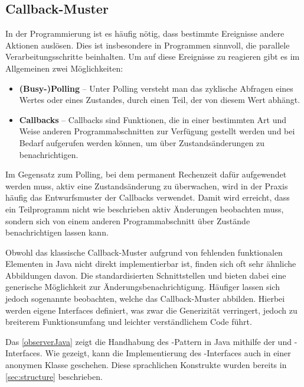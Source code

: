 \subsection{Callback-Muster}
In der Programmierung ist es häufig nötig, dass bestimmte Ereignisse andere Aktionen auslösen. Dies ist insbesondere in Programmen sinnvoll, die parallele Verarbeitungsschritte beinhalten. Um auf diese Ereignisse zu reagieren gibt es im Allgemeinen zwei Möglichkeiten: 

\begin{itemize}
    \item \textbf{(Busy-)Polling} -- Unter Polling versteht man das zyklische Abfragen eines Wertes oder eines Zustandes, durch einen Teil, der von diesem Wert abhängt.
    \item \textbf{Callbacks} -- Callbacks sind Funktionen, die in einer bestimmten Art und Weise anderen Programmabschnitten zur Verfügung gestellt werden und bei Bedarf aufgerufen werden können, um \zB über Zustandsänderungen zu benachrichtigen.
\end{itemize}

Im Gegensatz zum Polling, bei dem permanent Rechenzeit dafür aufgewendet werden muss, aktiv eine Zustandsänderung zu überwachen, wird in der Praxis häufig das Entwurfsmuster der Callbacks verwendet. Damit wird erreicht, dass ein Teilprogramm nicht wie beschrieben aktiv Änderungen beobachten muss, sondern sich von einem anderen Programmabschnitt über Zustände benachrichtigen lassen kann. 

Obwohl das klassische Callback-Muster aufgrund von fehlenden funktionalen Elementen in Java nicht direkt implementierbar ist, finden sich oft sehr ähnliche Abbildungen davon. Die standardisierten Schnittstellen   und  bieten dabei eine generische Möglichkeit zur Änderungsbenachrichtigung. Häufiger lassen sich jedoch sogenannte  beobachten, welche das Callback-Muster abbilden. Hierbei werden eigene Interfaces definiert, was zwar die Generizität verringert, jedoch zu breiterem Funktionsumfang und leichter verständlichem Code führt.

Das \autoref{observerJava} zeigt die Handhabung des -Pattern \cite{gamma_design_1995} in Java mithilfe der  und -Interfaces. Wie gezeigt, kann die Implementierung des -Interfaces auch in einer anonymen Klasse geschehen. Diese sprachlichen Konstrukte wurden bereits in \autoref{sec:structure} beschrieben. 

